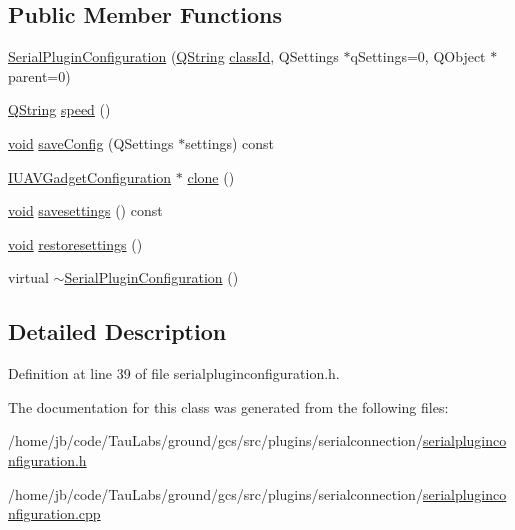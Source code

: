 \subsection*{\-Public \-Member \-Functions}
\begin{DoxyCompactItemize}
\item 
\hyperlink{group___serial_plugin_ga15a723a8f3215c718070ef32ea6fff2e}{\-Serial\-Plugin\-Configuration} (\hyperlink{group___u_a_v_objects_plugin_gab9d252f49c333c94a72f97ce3105a32d}{\-Q\-String} \hyperlink{group___core_plugin_gac953657221ba7fda967ada0408332641}{class\-Id}, \-Q\-Settings $\ast$q\-Settings=0, \-Q\-Object $\ast$parent=0)
\item 
\hyperlink{group___u_a_v_objects_plugin_gab9d252f49c333c94a72f97ce3105a32d}{\-Q\-String} \hyperlink{group___serial_plugin_ga1e6623a11c7e9c8e52411d2568dd4e7c}{speed} ()
\item 
\hyperlink{group___u_a_v_objects_plugin_ga444cf2ff3f0ecbe028adce838d373f5c}{void} \hyperlink{group___serial_plugin_ga01715638b8bff47aaa76961d1cd11f59}{save\-Config} (\-Q\-Settings $\ast$settings) const 
\item 
\hyperlink{group___core_plugin_gacdfdf0b1e39b5002472b76b6564ce51f}{\-I\-U\-A\-V\-Gadget\-Configuration} $\ast$ \hyperlink{group___serial_plugin_ga894fb8aa5280cdfb94f844d09f21e64d}{clone} ()
\item 
\hyperlink{group___u_a_v_objects_plugin_ga444cf2ff3f0ecbe028adce838d373f5c}{void} \hyperlink{group___serial_plugin_ga4a63c76785f20677382b69b52b9537f0}{savesettings} () const 
\item 
\hyperlink{group___u_a_v_objects_plugin_ga444cf2ff3f0ecbe028adce838d373f5c}{void} \hyperlink{group___serial_plugin_ga9c071c1ab20bf2139e54c469ab804332}{restoresettings} ()
\item 
virtual \hyperlink{group___serial_plugin_ga02088820254dad5d594d652f0d1ac556}{$\sim$\-Serial\-Plugin\-Configuration} ()
\end{DoxyCompactItemize}


\subsection{\-Detailed \-Description}


\-Definition at line 39 of file serialpluginconfiguration.\-h.



\-The documentation for this class was generated from the following files\-:\begin{DoxyCompactItemize}
\item 
/home/jb/code/\-Tau\-Labs/ground/gcs/src/plugins/serialconnection/\hyperlink{serialpluginconfiguration_8h}{serialpluginconfiguration.\-h}\item 
/home/jb/code/\-Tau\-Labs/ground/gcs/src/plugins/serialconnection/\hyperlink{serialpluginconfiguration_8cpp}{serialpluginconfiguration.\-cpp}\end{DoxyCompactItemize}

